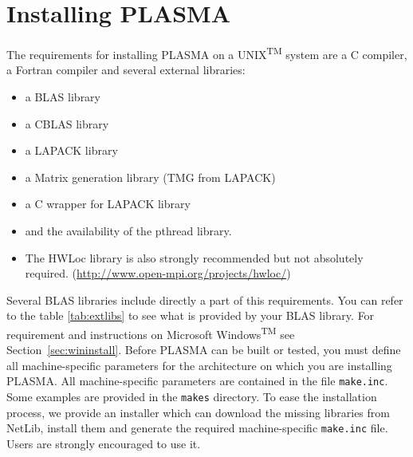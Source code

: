 
\chapter{Installing PLASMA\label{install}}


The requirements for installing PLASMA on a UNIX\textsuperscript{TM} system are
a C compiler, a Fortran compiler and several external libraries:
\begin{itemize}
\item a BLAS library
\item a CBLAS library
\item a LAPACK library
\item a Matrix generation library (TMG from LAPACK)
\item a C wrapper for LAPACK library
\item and the availability of the \textsf{pthread}
library.
\item The HWLoc library is also strongly recommended but not absolutely required. (\url{http://www.open-mpi.org/projects/hwloc/})
\end{itemize}
Several BLAS libraries include directly a part of this
requirements. You can refer to the table \ref{tab:extlibs} to see what
is provided by your BLAS library. 
For requirement and instructions on Microsoft Windows\textsuperscript{TM}
see Section~\ref{sec:wininstall}.
Before PLASMA can be built or tested, you must define all machine-specific parameters
for the architecture on which you are installing PLASMA.
All machine-specific parameters are contained in the file
\texttt{make.inc}. Some examples are provided in the \texttt{makes}
directory. 
To ease the installation process, we provide an installer which can
download the missing libraries from NetLib, install them and generate
the required machine-specific \texttt{make.inc} file. Users 
are strongly encouraged to use it.

